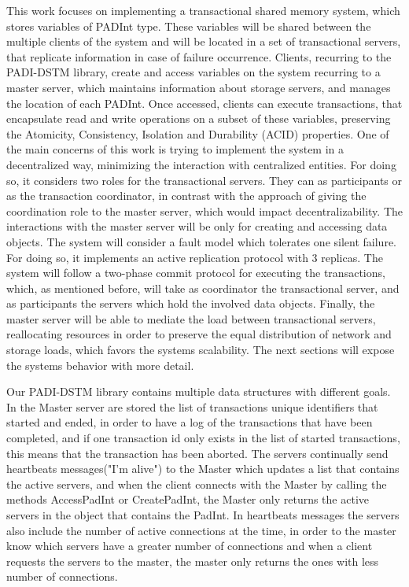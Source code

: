 \documentclass[times, 10pt,twocolumn]{article}
\begin{document}
This work focuses on implementing a transactional shared memory system, which stores variables of PADInt type. These variables will be shared between the multiple clients of the system and will be located in a set of transactional servers, that replicate information in case of failure occurrence. Clients, recurring to the PADI-DSTM library, create and access variables on the system recurring to a master server, which maintains information about storage servers, and manages the location of each PADInt. Once accessed, clients can execute transactions, that encapsulate read and write operations on a subset of these variables, preserving the Atomicity, Consistency, Isolation and Durability (ACID) properties. One of the main concerns of this work is trying to implement the system in a decentralized way, minimizing the interaction with centralized entities. For doing so, it considers two roles for the transactional servers. They can as participants or as the transaction coordinator, in contrast with the approach of giving the coordination role to the master server, which would impact decentralizability. The interactions with the master server will be only for creating and accessing data objects. The system will consider a fault model which tolerates one silent failure. For doing so, it implements an active replication protocol with 3 replicas. The system will follow a two-phase commit protocol for executing the transactions, which, as mentioned before, will take as coordinator the transactional server, and as participants the servers which hold the involved data objects. Finally, the master server will be able to mediate the load between transactional servers, reallocating resources in order to preserve the equal distribution of network and storage loads, which favors the systems scalability. The next sections will expose the systems behavior with more detail.




Our PADI-DSTM library contains multiple data structures with different goals. In the Master server are stored the list of transactions unique identifiers that started and ended, in order to have a log of the transactions that have been completed, and if one transaction id only exists in the list of started transactions, this means that the transaction has been aborted. The servers continually send  heartbeats messages("I'm alive") to the Master which updates a list that contains the active servers, and when the client connects with the Master by calling the methods AccessPadInt or CreatePadInt, the Master only returns the active servers in the object that contains the PadInt. In heartbeats messages the servers also include the number of active connections at the time, in order to the master know which servers have a greater number of connections and when a client requests the servers to the master, the master only returns the ones with less number of connections.  
\end{document}
